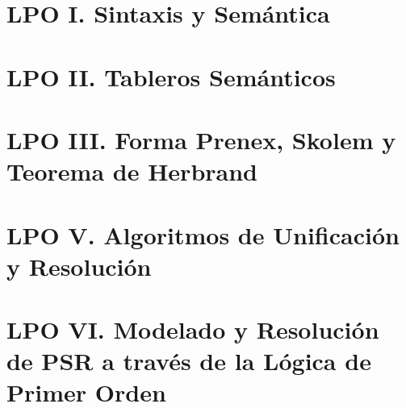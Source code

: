 \documentclass[a4paper]{report}
\begin{document}
\chapter{LPO I. Sintaxis y Semántica}
\chapter{LPO II. Tableros Semánticos}
\chapter{LPO III. Forma Prenex, Skolem y Teorema de Herbrand}
\chapter{LPO V. Algoritmos de Unificación y Resolución}
\chapter{LPO VI. Modelado y Resolución de PSR a través de la Lógica de Primer Orden}
\end{document}

